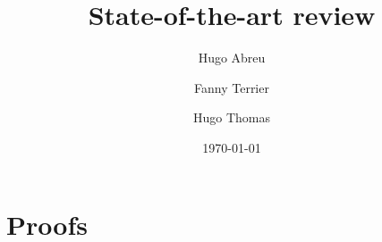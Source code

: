 

\title{State-of-the-art review}

\author[$\dag$]{Hugo Abreu}
\author[$\dag$]{Fanny Terrier}
\author[$\dag$]{Hugo Thomas}

\date{\today}


\maketitle
\thispagestyle{firststyle}










% 
% 



\printbibliography


\section{Proofs}
\printProofs

